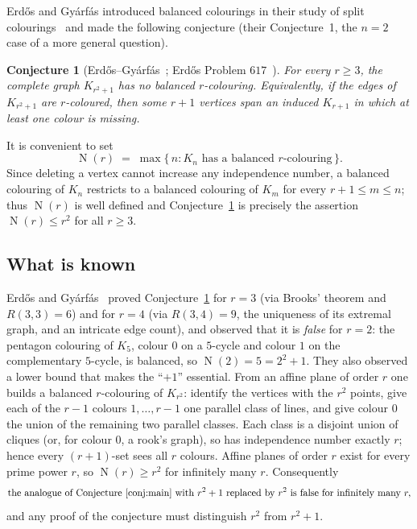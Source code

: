 \documentclass[11pt,reqno]{amsart}
\newtheorem{conjecture}[theorem]{Conjecture}
\theoremstyle{definition}
\theoremstyle{remark}
\DeclareMathOperator{\Ncap}{N}
\begin{document}
Erd\H{o}s and Gy\'arf\'as introduced balanced colourings in their study of split
colourings~\cite{ErGy99} and made the following conjecture (their Conjecture~1,
the $n=2$ case of a more general question).

\begin{conjecture}[Erd\H{o}s--Gy\'arf\'as~\cite{ErGy99}; Erd\H{o}s Problem
$617$~\cite{Bloom617}]\label{conj:main}
For every $r\ge 3$, the complete graph $K_{r^2+1}$ has no balanced $r$-colouring.
Equivalently, if the edges of $K_{r^2+1}$ are $r$-coloured, then some $r+1$
vertices span an induced $K_{r+1}$ in which at least one colour is missing.
\end{conjecture}

It is convenient to set
\[
  \Ncap(r)\;=\;\max\{\, n : K_n \text{ has a balanced } r\text{-colouring}\,\}.
\]
Since deleting a vertex cannot increase any independence number, a balanced
colouring of $K_n$ restricts to a balanced colouring of $K_m$ for every
$r+1\le m\le n$; thus $\Ncap(r)$ is well defined and Conjecture~\ref{conj:main}
is precisely the assertion $\Ncap(r)\le r^2$ for all $r\ge 3$.

\subsection{What is known}
Erd\H{o}s and Gy\'arf\'as~\cite{ErGy99} proved
Conjecture~\ref{conj:main} for $r=3$ (via Brooks' theorem and $R(3,3)=6$) and for
$r=4$ (via $R(3,4)=9$, the uniqueness of its extremal graph, and an intricate
edge count), and observed that it is \emph{false} for $r=2$: the pentagon
colouring of $K_5$, colour $0$ on a $5$-cycle and colour $1$ on the complementary
$5$-cycle, is balanced, so $\Ncap(2)=5=2^2+1$. They also observed a lower bound
that makes the ``$+1$'' essential. From an affine plane of order $r$ one builds a
balanced $r$-colouring of $K_{r^2}$: identify the vertices with the $r^2$ points,
give each of the $r-1$ colours $1,\dots,r-1$ one parallel class of lines, and
give colour $0$ the union of the remaining two parallel classes. Each class is a
disjoint union of cliques (or, for colour $0$, a rook's graph), so has
independence number exactly $r$; hence every $(r+1)$-set sees all $r$ colours.
Affine planes of order $r$ exist for every prime power $r$, so $\Ncap(r)\ge r^2$
for infinitely many $r$. Consequently
\[
  \text{the analogue of Conjecture~\ref{conj:main} with } r^2+1
  \text{ replaced by } r^2 \text{ is false for infinitely many } r,
\]
and any proof of the conjecture must distinguish $r^2$ from $r^2+1$.
\end{document}
